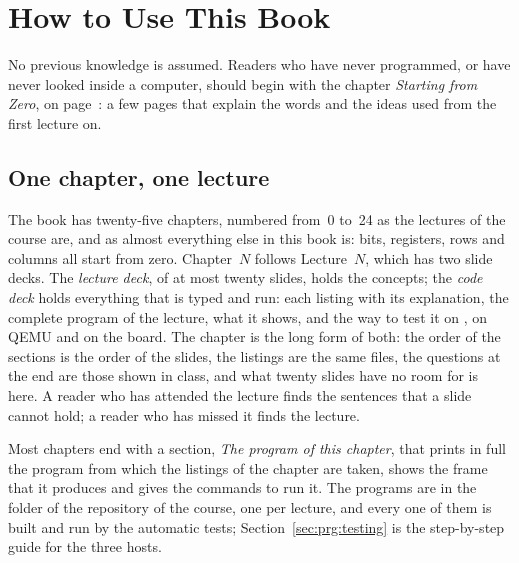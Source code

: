 \chapter{How to Use This Book}

No previous knowledge is assumed. Readers who have never programmed, or have
never looked inside a computer, should begin with the chapter \emph{Starting
from Zero}, on page~\pageref{ch:zero}: a few pages that explain the words and
the ideas used from the first lecture on.

\section*{One chapter, one lecture}

The book has twenty-five chapters, numbered from~0 to~24 as the lectures of the
course are, and as almost everything else in this book is: bits, registers,
rows and columns all start from zero. Chapter~$N$ follows Lecture~$N$, which
has two slide decks. The \emph{lecture deck}, of at most twenty slides, holds
the concepts; the \emph{code deck} holds everything that is typed and run:
each listing with its explanation, the complete program of the lecture, what
it shows, and the way to test it on \prgqt, on QEMU and on the board. The
chapter is the long form of both: the order of the sections is the order of
the slides, the listings are the same files, the questions at the end are
those shown in class, and what twenty slides have no room for is here. A
reader who has attended the lecture finds the sentences that a slide cannot
hold; a reader who has missed it finds the lecture.

Most chapters end with a section, \emph{The program of this chapter}, that
prints in full the program from which the listings of the chapter are taken,
shows the frame that it produces and gives the commands to run it. The
programs are in the folder  of the repository of the course, one
per lecture, and every one of them is built and run by the automatic tests;
Section~\ref{sec:prg:testing} is the step-by-step guide for the three hosts.

